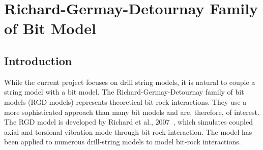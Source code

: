 \section{Richard-Germay-Detournay Family of Bit Model}
\label{ch:rgdmodels}

\subsection{Introduction}
While the current project focuses on drill string models, it is natural to couple a string model with a bit model. The Richard-Germay-Detournay family of bit models (RGD models) represents theoretical bit-rock interactions. They use a more sophisticated approach than many bit models and are, therefore, of interest. The RGD model is developed by Richard et al., 2007\ \cite{ref:richard2007a}, which simulates coupled axial and torsional vibration mode through bit-rock interaction. The model has been applied to numerous drill-string models to model bit-rock interactions.

